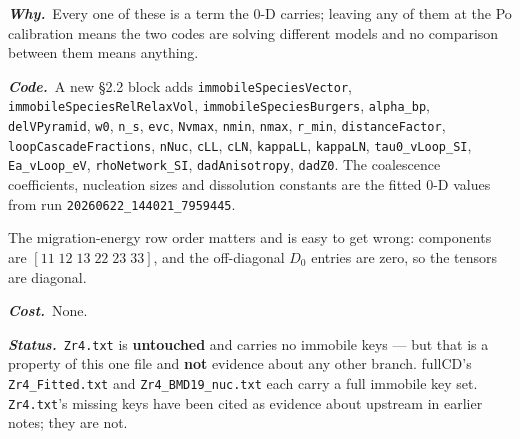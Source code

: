 \documentclass[11pt,a4paper]{article}
\newcommand{\code}[1]{\texttt{\small #1}}
\newcommand{\why}[1]{\par\noindent\textbf{\itshape Why.}\ #1\par}
\newcommand{\impact}[1]{\par\noindent\textbf{\itshape Code.}\ #1\par}
\newcommand{\cost}[1]{\par\noindent\textbf{\itshape Cost.}\ #1\par}
\newcommand{\status}[1]{\par\noindent\textbf{\itshape Status.}\ #1\par}
\begin{document}
\why{Every one of these is a term the 0-D carries; leaving any of them at the
Po calibration means the two codes are solving different models and no
comparison between them means anything.}
\impact{A new \S2.2 block adds \code{immobileSpeciesVector},
\code{immobileSpeciesRelRelaxVol}, \code{immobileSpeciesBurgers},
\code{alpha\_bp}, \code{delVPyramid}, \code{w0}, \code{n\_s}, \code{evc},
\code{Nvmax}, \code{nmin}, \code{nmax}, \code{r\_min}, \code{distanceFactor},
\code{loopCascadeFractions}, \code{nNuc}, \code{cLL}, \code{cLN},
\code{kappaLL}, \code{kappaLN}, \code{tau0\_vLoop\_SI}, \code{Ea\_vLoop\_eV},
\code{rhoNetwork\_SI}, \code{dadAnisotropy}, \code{dadZ0}. The coalescence
coefficients, nucleation sizes and dissolution constants are the fitted 0-D
values from run \code{20260622\_144021\_7959445}.

The migration-energy row order matters and is easy to get wrong: components
are $[11\;12\;13\;22\;23\;33]$, and the off-diagonal $D_0$ entries are zero, so
the tensors are diagonal.}
\cost{None.}
\status{\code{Zr4.txt} is \textbf{untouched} and carries no immobile keys ---
but that is a property of this one file and \textbf{not} evidence about any
other branch. fullCD's \code{Zr4\_Fitted.txt} and \code{Zr4\_BMD19\_nuc.txt}
each carry a full immobile key set. \code{Zr4.txt}'s missing keys have been
cited as evidence about upstream in earlier notes; they are not.}
\end{document}
